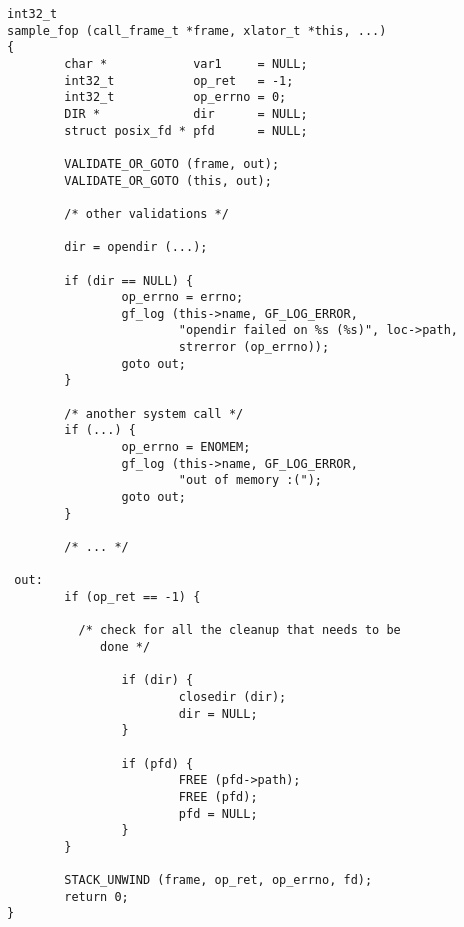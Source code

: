 \documentclass{article}[12pt]
\begin{document}
\begin{verbatim}
int32_t
sample_fop (call_frame_t *frame, xlator_t *this, ...)
{
        char *            var1     = NULL;
        int32_t           op_ret   = -1;
        int32_t           op_errno = 0;
        DIR *             dir      = NULL;
        struct posix_fd * pfd      = NULL;

        VALIDATE_OR_GOTO (frame, out);
        VALIDATE_OR_GOTO (this, out);

        /* other validations */

        dir = opendir (...);

        if (dir == NULL) {
                op_errno = errno;
                gf_log (this->name, GF_LOG_ERROR,
                        "opendir failed on %s (%s)", loc->path,
                        strerror (op_errno));
                goto out;
        }

        /* another system call */
        if (...) {
                op_errno = ENOMEM;
                gf_log (this->name, GF_LOG_ERROR,
                        "out of memory :(");
                goto out;
        }

        /* ... */

 out:
        if (op_ret == -1) {

          /* check for all the cleanup that needs to be
             done */

                if (dir) {
                        closedir (dir);
                        dir = NULL;
                }

                if (pfd) {
                        FREE (pfd->path);
                        FREE (pfd);
                        pfd = NULL;
                }
        }

        STACK_UNWIND (frame, op_ret, op_errno, fd);
        return 0;
}
\end{verbatim}
\end{document}
